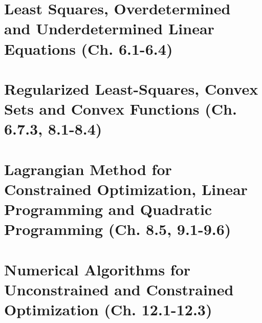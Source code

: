 \documentclass{article}
\begin{document}
\section{Least Squares, Overdetermined and Underdetermined Linear Equations (Ch. 6.1-6.4)}


\section{Regularized Least-Squares, Convex Sets and Convex Functions (Ch. 6.7.3, 8.1-8.4)}


\section{Lagrangian Method for Constrained Optimization, Linear Programming and Quadratic Programming (Ch. 8.5, 9.1-9.6)}


\section{Numerical Algorithms for Unconstrained and Constrained Optimization (Ch. 12.1-12.3)}

\end{document}
